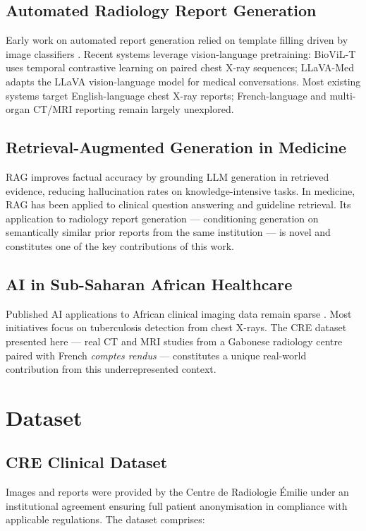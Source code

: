 \documentclass[conference]{IEEEtran}
\begin{document}
\subsection{Automated Radiology Report Generation}
Early work on automated report generation relied on template filling driven
by image classifiers \cite{shin2016}. Recent systems leverage vision-language
pretraining: BioViL-T \cite{bannur2023} uses temporal contrastive learning on
paired chest X-ray sequences; LLaVA-Med adapts the LLaVA vision-language model
for medical conversations. Most existing systems target English-language chest
X-ray reports; French-language and multi-organ CT/MRI reporting remain largely
unexplored.

\subsection{Retrieval-Augmented Generation in Medicine}
RAG \cite{lewis2020} improves factual accuracy by grounding LLM generation in
retrieved evidence, reducing hallucination rates on knowledge-intensive tasks.
In medicine, RAG has been applied to clinical question answering and guideline
retrieval. Its application to radiology report generation --- conditioning
generation on semantically similar prior reports from the same institution --- is
novel and constitutes one of the key contributions of this work.

\subsection{AI in Sub-Saharan African Healthcare}
Published AI applications to African clinical imaging data remain sparse
\cite{osei2019}. Most initiatives focus on tuberculosis detection from chest
X-rays. The CRE dataset presented here --- real CT and MRI studies from a
Gabonese radiology centre paired with French \textit{comptes rendus} ---
constitutes a unique real-world contribution from this underrepresented context.

\section{Dataset}

\subsection{CRE Clinical Dataset}
Images and reports were provided by the Centre de Radiologie \'{E}milie under
an institutional agreement ensuring full patient anonymisation in compliance
with applicable regulations. The dataset comprises:
\end{document}

